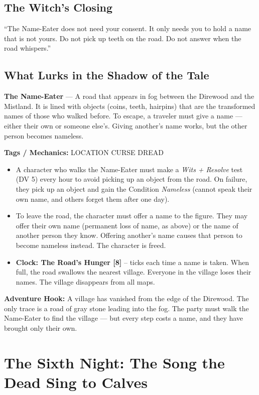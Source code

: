 \documentclass[10pt,twoside]{book}
\newcommand{\tag}[1]{\textsc{#1}}
\begin{document}
\section*{The Witch's Closing}
``The Name-Eater does not need your consent. It only needs you to hold a name that is not yours. Do not pick up teeth on the road. Do not answer when the road whispers.''

\section*{What Lurks in the Shadow of the Tale}
\begin{infobox}
\textbf{The Name-Eater} --- A road that appears in fog between the Direwood and the Mistland. It is lined with objects (coins, teeth, hairpins) that are the transformed names of those who walked before. To escape, a traveler must give a name --- either their own or someone else's. Giving another's name works, but the other person becomes nameless.

\textbf{Tags / Mechanics:} \tag{LOCATION} \tag{CURSE} \tag{DREAD}

\begin{itemize}
\item A character who walks the Name-Eater must make a \textit{Wits + Resolve} test (DV 5) every hour to avoid picking up an object from the road. On failure, they pick up an object and gain the Condition \textit{Nameless} (cannot speak their own name, and others forget them after one day).
\item To leave the road, the character must offer a name to the figure. They may offer their own name (permanent loss of name, as above) or the name of another person they know. Offering another's name causes that person to become nameless instead. The character is freed.
\item \textbf{Clock: The Road's Hunger [8]} -- ticks each time a name is taken. When full, the road swallows the nearest village. Everyone in the village loses their names. The village disappears from all maps.
\end{itemize}

\textbf{Adventure Hook:} A village has vanished from the edge of the Direwood. The only trace is a road of gray stone leading into the fog. The party must walk the Name-Eater to find the village --- but every step costs a name, and they have brought only their own.
\end{infobox}

\chapter{The Sixth Night: The Song the Dead Sing to Calves}
\end{document}
